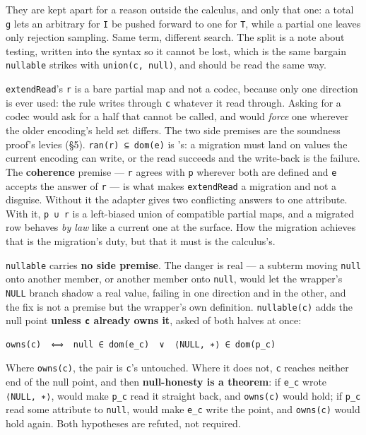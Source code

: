They are kept apart for a reason outside the calculus, and only that one: a total \texttt{g} lets an
arbitrary for \texttt{I} be pushed forward to one for \texttt{T}, while a partial one leaves only rejection
sampling. Same term, different search. The split is a note about testing, written into the syntax
so it cannot be lost, which is the same bargain \texttt{nullable} strikes with \texttt{union(c,\ null)}, and
should be read the same way.

\texttt{extendRead}'s \texttt{r} is a bare partial map and not a codec, because only one direction is ever used: the
rule writes through \texttt{c} whatever it read through. Asking for a codec would ask for a half that cannot
be called, and would \emph{force} one wherever the older encoding's held set differs. The two side
premises are the soundness proof's levies (§5). \texttt{ran(r)\ ⊆\ dom(e)} is 's: a migration must
land on values the current encoding can write, or the read succeeds and the write-back is the
failure. The \textbf{coherence} premise — \texttt{r} agrees with \texttt{p} wherever both are defined and \texttt{e} accepts the answer of \texttt{r} — is what makes
\texttt{extendRead} a migration and not a disguise. Without it the adapter gives two conflicting
answers to one attribute. With it, \texttt{p\ ∪\ r} is a left-biased union of compatible partial maps,
and a migrated row behaves \emph{by law} like a current one at the surface. How the migration achieves
that is the migration's duty, but that it must is the calculus's.

\texttt{nullable} carries \textbf{no side premise}. The
danger is real — a subterm moving \texttt{null} onto another member, or another member onto \texttt{null}, would
let the wrapper's \texttt{NULL} branch shadow a real value, failing  in one direction and 
in the other, and the fix is not a premise but the wrapper's own definition. \texttt{nullable(c)} adds the
null point \textbf{unless \texttt{c} already owns it}, asked of both halves at once:

\begin{verbatim}
owns(c)  ⟺  null ∈ dom(e_c)  ∨  ⟨NULL, ∗⟩ ∈ dom(p_c)
\end{verbatim}

Where \texttt{owns(c)}, the pair is \texttt{c}'s untouched. Where it does not, \texttt{c} reaches neither end of the null
point, and then \textbf{null-honesty is a theorem}: if \texttt{e\_c} wrote
\texttt{⟨NULL,\ ∗⟩},  would make \texttt{p\_c} read it straight back, and \texttt{owns(c)} would hold; if \texttt{p\_c} read
some attribute to \texttt{null},  would make \texttt{e\_c} write the point, and \texttt{owns(c)} would hold again.
Both hypotheses are refuted, not required.

